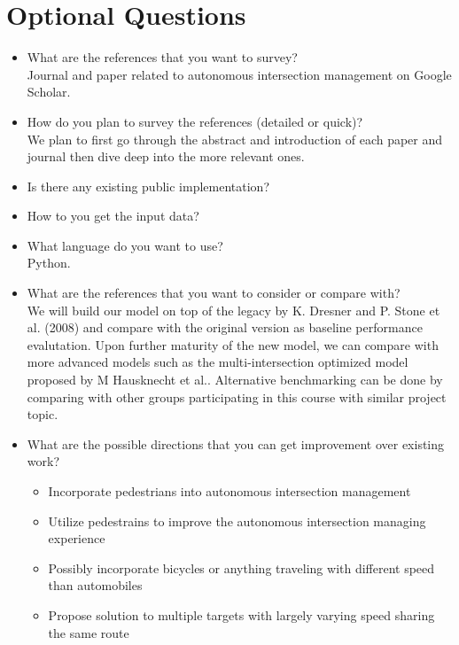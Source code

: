 \documentclass[12pt]{article}
\begin{document}
\section{Optional Questions}
\begin{itemize}
    \item What are the references that you want to survey?\\
      Journal and paper related to autonomous intersection management on Google Scholar.     
    \item How do you plan to survey the references (detailed or quick)?\\
      We plan to first go through the abstract and introduction of each paper and journal then dive deep into the more relevant ones.
    \item Is there any existing public implementation?
    \item How to you get the input data?
    \item What language do you want to use?\\
      Python.
    \item What are the references that you want to consider or compare with?\\
      We will build our model on top of the legacy by K. Dresner and P. Stone et al. (2008) and compare with the original version as baseline performance evalutation.
      Upon further maturity of the new model, we can compare with more advanced models such as the multi-intersection optimized model proposed by M Hausknecht et al..
      Alternative benchmarking can be done by comparing with other groups participating in this course with similar project topic.
    \item What are the possible directions that you can get improvement over existing work?
      \begin{itemize}
        \item Incorporate pedestrians into autonomous intersection management
        \item Utilize pedestrains to improve the autonomous intersection managing experience
        \item Possibly incorporate bicycles or anything traveling with different speed than automobiles 
        \item Propose solution to multiple targets with largely varying speed sharing the same route
      \end{itemize}
\end{itemize}
\end{document}
